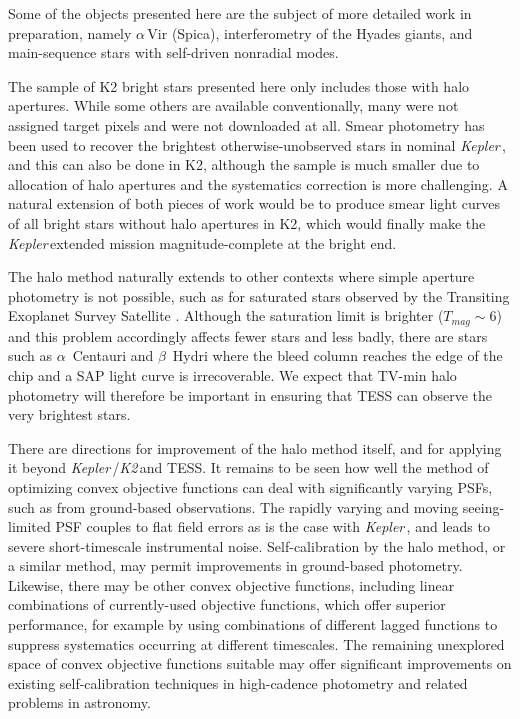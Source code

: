 \documentclass[modern]{aastex62}
\newcommand\kepler{\emph{Kepler}\,}
\newcommand\ktwo{\emph{K2}\,}
\begin{document}
Some of the objects presented here are the subject of more detailed work in preparation, namely $\alpha$\,Vir (Spica), interferometry of the Hyades giants, and main-sequence stars with self-driven nonradial modes.

The sample of K2 bright stars presented here only includes those with halo apertures. While some others are available conventionally, many were not assigned target pixels and were not downloaded at all. Smear photometry has been used to recover the brightest otherwise-unobserved stars in nominal \kepler \citep{smearcampaign}, and this can also be done in K2, although the sample is much smaller due to allocation of halo apertures and the systematics correction is more challenging. A natural extension of both pieces of work would be to produce smear light curves of all bright stars without halo apertures in K2, which would finally make the \kepler extended mission magnitude-complete at the bright end. 

The halo method naturally extends to other contexts where simple aperture photometry is not possible, such as for saturated stars observed by the Transiting Exoplanet Survey Satellite \citep[TESS;][]{tess}. Although the saturation limit is brighter ($T_{mag} \sim 6$) and this problem accordingly affects fewer stars and less badly, there are stars such as $\alpha$~Centauri and $\beta$~Hydri where the bleed column reaches the edge of the chip and a SAP light curve is irrecoverable. We expect that TV-min halo photometry will therefore be important in ensuring that TESS can observe the very brightest stars.

There are directions for improvement of the halo method itself, and for applying it beyond \kepler/\ktwo and TESS. It remains to be seen how well the method of optimizing convex objective functions can deal with significantly varying PSFs, such as from ground-based observations. The rapidly varying and moving seeing-limited PSF couples to flat field errors as is the case with \kepler, and leads to severe short-timescale instrumental noise. Self-calibration by the halo method, or a similar method, may permit improvements in ground-based photometry. Likewise, there may be other convex objective functions, including linear combinations of currently-used objective functions, which offer superior performance, for example by using combinations of different lagged functions to suppress systematics occurring at different timescales. The remaining unexplored space of convex objective functions suitable may offer significant improvements on existing self-calibration techniques in high-cadence photometry and related problems in astronomy.
\end{document}
